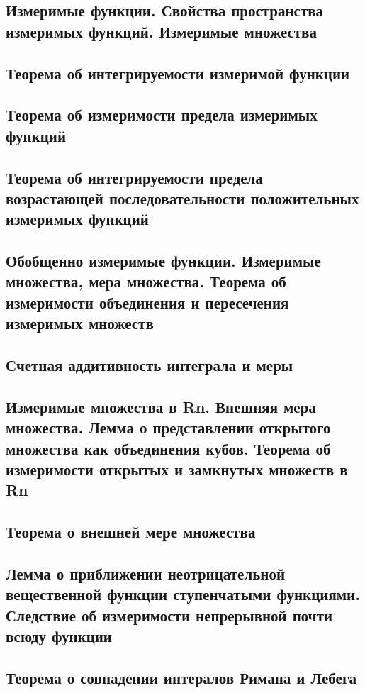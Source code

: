 \documentclass[a4paper]{article}
\theoremstyle{definition}
\theoremstyle{remark}
\begin{document}
    \subsection{ Измеримые функции. Свойства пространства измеримых функций. Измеримые множества}
    \subsection{ Теорема об интегрируемости измеримой функции}
    \subsection{ Теорема об измеримости предела измеримых функций}
    \subsection{ Теорема об интегрируемости предела возрастающей
    последовательности положительных измеримых функций}
    \subsection{ Обобщенно измеримые функции. Измеримые множества, мера множества. Теорема об измеримости объединения и пересечения измеримых множеств}
    \subsection{ Счетная аддитивность интеграла и меры}
    \subsection{ Измеримые множества в Rn. Внешняя мера множества. Лемма о представлении открытого множества как объединения кубов. Теорема об измеримости открытых и замкнутых множеств в Rn}
    \subsection{ Теорема о внешней мере множества}
    \subsection{ Лемма о приближении неотрицательной вещественной функции ступенчатыми функциями. Следствие об измеримости непрерывной почти всюду функции}
    \subsection{ Теорема о совпадении интералов Римана и Лебега}
\end{document}
